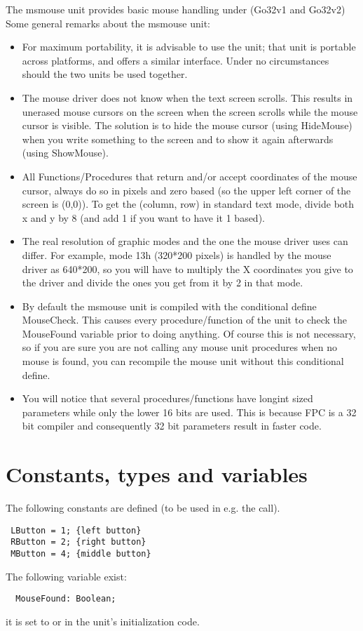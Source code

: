 The msmouse unit provides basic mouse handling under \dos (Go32v1 and Go32v2)
Some general remarks about the msmouse unit:
\begin{itemize}
\item For maximum portability, it is advisable to use the  unit;
that unit is portable across platforms, and offers a similar interface.
Under no circumstances should the two units be used together.
\item The mouse driver does not know when the text screen scrolls. This results
in unerased mouse cursors on the screen when the screen scrolls while the
mouse cursor is visible. The solution is to hide the mouse cursor (using
HideMouse) when you write something to the screen and to show it again
afterwards (using ShowMouse).
\item All Functions/Procedures that return and/or accept coordinates of the mouse
cursor, always do so in pixels and zero based (so the upper left corner of
the screen is (0,0)). To get the (column, row) in standard text mode, divide
both x and y by 8 (and add 1 if you want to have it 1 based).
\item The real resolution of graphic modes and the one the mouse driver uses can
differ. For example, mode 13h (320*200 pixels) is handled by the mouse driver
as 640*200, so you will have to multiply the X coordinates you give to the
driver and divide the ones you get from it by 2 in that mode.
\item By default the msmouse unit is compiled with the conditional define
MouseCheck. This causes every procedure/function of the unit to check the
MouseFound variable prior to doing anything. Of course this is not necessary,
so if you are sure you are not calling any mouse unit procedures when no
mouse is found, you can recompile the mouse unit without this conditional
define.
\item
You will notice that several procedures/functions have longint sized
parameters while only the lower 16 bits are used. This is because FPC is
a 32 bit compiler and consequently 32 bit parameters result in faster code.
\end{itemize}
\section{Constants, types and variables}
The following constants are defined (to be used in e.g. the
 call).
\begin{verbatim}
 LButton = 1; {left button}
 RButton = 2; {right button}
 MButton = 4; {middle button}
\end{verbatim}
The following variable exist: 
\begin{verbatim}
  MouseFound: Boolean;
\end{verbatim}
it is set to  or  in the unit's initialization code.

